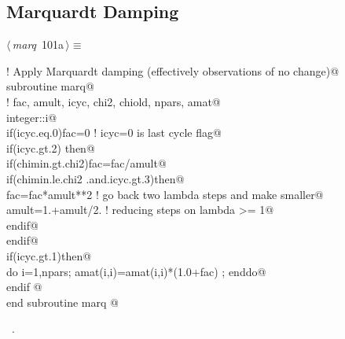 \documentclass[10pt,a4paper,notitlepage]{article}
\begin{document}
\subsection{Marquardt Damping}
\begin{flushleft} \small
\begin{minipage}{\linewidth}\label{scrap124}\raggedright\small
{} $\langle\,${\it marq}\nobreak\ {\footnotesize {101a}}$\,\rangle\equiv$
\vspace{-1ex}
\begin{list}{}{} \item
\mbox{}\verb@      ! Apply Marquardt damping (effectively observations of no change)@\\
\mbox{}\verb@      subroutine marq@\\
\mbox{}\verb@! fac, amult, icyc, chi2, chiold, npars, amat@\\
\mbox{}\verb@      integer::i@\\
\mbox{}\verb@      if(icyc.eq.0)fac=0                ! icyc=0 is last cycle flag@\\
\mbox{}\verb@      if(icyc.gt.2) then@\\
\mbox{}\verb@       if(chimin.gt.chi2)fac=fac/amult@\\
\mbox{}\verb@       if(chimin.le.chi2 .and.icyc.gt.3)then@\\
\mbox{}\verb@         fac=fac*amult**2        ! go back two lambda steps and make smaller@\\
\mbox{}\verb@         amult=1.+amult/2.    ! reducing steps on lambda >= 1@\\
\mbox{}\verb@       endif@\\
\mbox{}\verb@      endif@\\
\mbox{}\verb@      if(icyc.gt.1)then@\\
\mbox{}\verb@       do i=1,npars; amat(i,i)=amat(i,i)*(1.0+fac) ; enddo@\\
\mbox{}\verb@      endif @\\
\mbox{}\verb@      end subroutine marq     @{\NWsep}
\end{list}
\vspace{-1.5ex}
\footnotesize
\begin{list}{}{\setlength{\itemsep}{-\parsep}\setlength{\itemindent}{-\leftmargin}}
\item \NWtxtMacroRefIn\ .

\item{}
\end{list}
\end{minipage}\vspace{4ex}
\end{flushleft}
\end{document}
